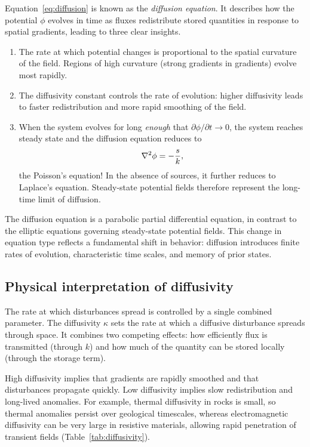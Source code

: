 Equation~\ref{eq:diffusion} is known as the \emph{diffusion equation}. It describes how the potential $\phi$ evolves in time as fluxes redistribute stored quantities in response to spatial gradients, leading to three clear insights.
\begin{enumerate}
    \item The rate at which potential changes is proportional to the spatial curvature of the field. Regions of high curvature (strong gradients in gradients) evolve most rapidly.

    \item The diffusivity constant controls the rate of evolution: higher diffusivity leads to faster redistribution and more rapid smoothing of the field.

    \item When the system evolves for long \emph{enough} that $\partial \phi / \partial t \to 0$, the system reaches steady state and the diffusion equation reduces to
    \[
        \laplacian \phi = -\frac{s}{k},
    \]
    the Poisson's equation! In the absence of sources, it further reduces to Laplace's equation. Steady-state potential fields therefore represent the long-time limit of diffusion.
\end{enumerate}

The diffusion equation is a parabolic partial differential equation, in contrast to the elliptic equations governing steady-state potential fields. This change in equation type reflects a fundamental shift in behavior: diffusion introduces finite rates of evolution, characteristic time scales, and memory of prior states.


\subsection{Physical interpretation of diffusivity}

The rate at which disturbances spread is controlled by a single combined parameter.  The diffusivity $\kappa$ sets the rate at which a diffusive disturbance spreads through space. It combines two competing effects: how efficiently flux is transmitted (through $k$) and how much of the quantity can be stored locally (through the storage term).

High diffusivity implies that gradients are rapidly smoothed and that disturbances propagate quickly. Low diffusivity implies slow redistribution and long-lived anomalies. For example, thermal diffusivity in rocks is small, so thermal anomalies persist over geological timescales, whereas electromagnetic diffusivity can be very large in resistive materials, allowing rapid penetration of transient fields (Table~\ref{tab:diffusivity}).



